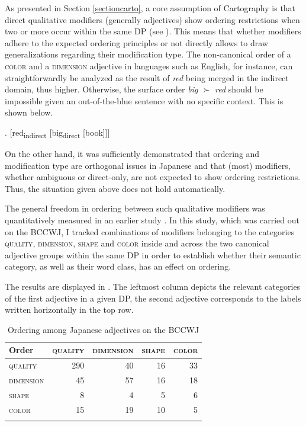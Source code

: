 As presented in Section \ref{sectioncarto}, a core assumption of Cartography is that direct qualitative modifiers (generally adjectives) show ordering restrictions when two or more occur within the same DP (see \citealt{scott:2002:stacked, cinque:2010:adj, laenzlinger:2011:elements}). This means that whether modifiers adhere to the expected ordering principles or not directly allows to draw generalizations regarding their modification type. The non-canonical order of a \textsc{color} and a \textsc{dimension} adjective in languages such as  English, for instance, can straightforwardly be analyzed as the result of \textit{red} being merged in the indirect domain, thus higher. Otherwise, the surface order \textit{big $\succ$ red} should be impossible given an out-of-the-blue sentence with no specific context. This is shown below.

\ex. [red\textsubscript{indirect} [big\textsubscript{direct} [book]]]

On the other hand, it was sufficiently demonstrated that ordering and modification type are orthogonal issues in Japanese and that (most) modifiers, whether ambiguous or direct-only, are not expected to show ordering restrictions. Thus, the situation given above does not hold automatically.

The general freedom in ordering between such qualitative modifiers was quantitatively measured in an earlier study \citep{kohlich:2018:die}. In this study, which was carried out on the BCCWJ, I tracked combinations of modifiers belonging to the categories \textsc{quality}, \textsc{dimension}, \textsc{shape} and \textsc{color} inside and across the two canonical adjective groups within the same DP in order to establish whether their semantic category, as well as their word class, has an effect on ordering.

The results are displayed in . The leftmost column depicts the relevant categories of the first adjective in a given DP, the second adjective corresponds to the labels written horizontally in the top row.

\begin{table}
\centering
\begin{tabular}{lrrrr}
\lsptoprule
\textbf{Order} & \textsc{quality} & \textsc{dimension} & \textsc{shape} & \textsc{color} \\
\midrule
\textsc{quality}    & 290 & 40 & 16 & 33 \\
\textsc{dimension}  & 45  & 57 & 16 & 18 \\
\textsc{shape}      & 8   & 4  & 5  & 6 \\
\textsc{color}      & 15  & 19 & 10 & 5 \\
\lspbottomrule
\end{tabular}
\caption{Ordering among Japanese adjectives on the BCCWJ}
\label{adjective ordering BCCWJ}
\end{table}

